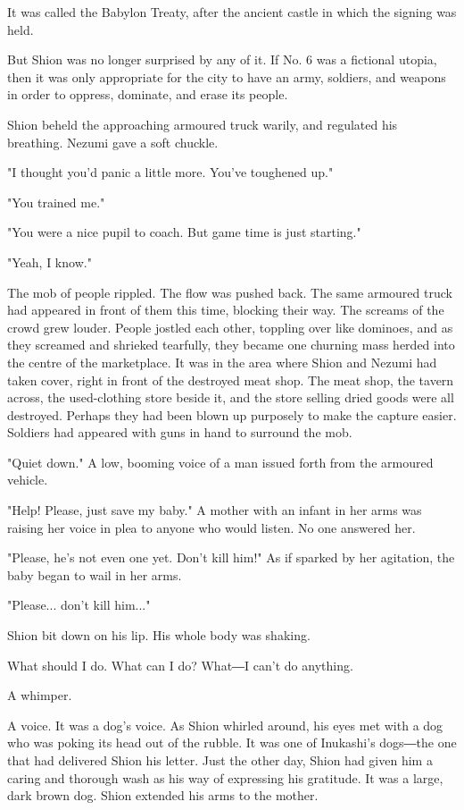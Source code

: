 It was called the Babylon Treaty, after the ancient castle in which the
signing was held.

But Shion was no longer surprised by any of it. If No. 6 was a fictional
utopia, then it was only appropriate for the city to have an army,
soldiers, and weapons in order to oppress, dominate, and erase its
people.

Shion beheld the approaching armoured truck warily, and regulated his
breathing. Nezumi gave a soft chuckle.

"I thought you'd panic a little more. You've toughened up."

"You trained me."

"You were a nice pupil to coach. But game time is just starting."

"Yeah, I know."

The mob of people rippled. The flow was pushed back. The same armoured
truck had appeared in front of them this time, blocking their way. The
screams of the crowd grew louder. People jostled each other, toppling
over like dominoes, and as they screamed and shrieked tearfully, they
became one churning mass herded into the centre of the marketplace. It
was in the area where Shion and Nezumi had taken cover, right in front
of the destroyed meat shop. The meat shop, the tavern across, the
used-clothing store beside it, and the store selling dried goods were
all destroyed. Perhaps they had been blown up purposely to make the
capture easier. Soldiers had appeared with guns in hand to surround the
mob.

"Quiet down." A low, booming voice of a man issued forth from the
armoured vehicle.

"Help! Please, just save my baby." A mother with an infant in her arms
was raising her voice in plea to anyone who would listen. No one
answered her.

"Please, he's not even one yet. Don't kill him!" As if sparked by her
agitation, the baby began to wail in her arms.

"Please... don't kill him..."

Shion bit down on his lip. His whole body was shaking.

What should I do. What can I do? What―I can't do anything.

A whimper.

A voice. It was a dog's voice. As Shion whirled around, his eyes met
with a dog who was poking its head out of the rubble. It was one of
Inukashi's dogs―the one that had delivered Shion his letter. Just the
other day, Shion had given him a caring and thorough wash as his way of
expressing his gratitude. It was a large, dark brown dog. Shion extended
his arms to the mother.


